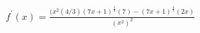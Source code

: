 $ \displaystyle f^{\prime}(x) = \frac{(x^2(4/3)(7x+1)^{\frac{1}{3}}(7) - (7x+1)^{\frac{4}{3}} (2x)}{(x^2)^2} $